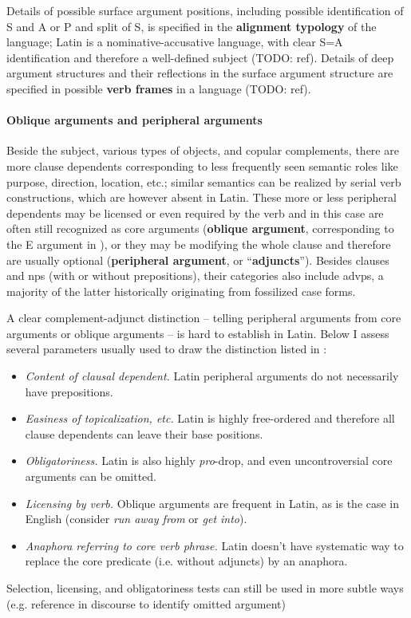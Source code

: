 \documentclass[a4paper, oneside, 12pt]{report}
\newcommand*{\citesec}[1]{\S~{#1}}
\newcommand*{\citepage}[1]{p.~{#1}}
\newcommand*{\concept}[1]{\textbf{#1}}
\newcommand*{\term}[1]{\emph{#1}}
\newcommand{\form}[1]{\emph{#1}}
\newcommand*{\category}[1]{\textsc{#1}}
\begin{document}
Details of possible surface argument positions,
including possible identification of \category{S} and \category{A} or \category{P} 
and split of \category{S},
is specified in the \concept{alignment typology} of the language;
Latin is a nominative-accusative language, 
with clear \category{S}=\category{A} identification 
and therefore a well-defined subject (TODO: ref).
Details of deep argument structures and their reflections in the surface argument structure 
are specified in possible \concept{verb frames} in a language
(TODO: ref).

\paragraph*{Oblique arguments and peripheral arguments} 
Beside the subject, various types of objects, and copular complements,
there are more clause dependents
corresponding to less frequently seen semantic roles 
like purpose, direction, location, etc.; 
similar semantics can be realized by serial verb constructions, which are however absent in Latin.
These more or less peripheral dependents may be licensed or even required by the verb 
and in this case are often still recognized as core arguments
(\concept{oblique argument}, 
corresponding to the E argument in \citet[\citepage{116}]{dixon2010basic2}),
or they may be modifying the whole clause and therefore are usually optional 
(\concept{peripheral argument}, or ``\concept{adjuncts}'').
Besides clauses and \ac{np}s (with or without prepositions),
their categories also include \ac{advp}s,
a majority of the latter historically originating from fossilized case forms.



A clear complement-adjunct distinction 
-- telling peripheral arguments from core arguments or oblique arguments --
is hard to establish in Latin.
Below I assess several parameters usually used to draw the distinction
listed in \citet[\citesec{4.1.2}]{cgel}:
\begin{itemize}
    \item \emph{Content of clausal dependent.} Latin peripheral arguments do not necessarily have prepositions.
    \item \emph{Easiness of topicalization, etc.} Latin is highly free-ordered and therefore all clause dependents 
    can leave their base positions.
    \item \emph{Obligatoriness.} Latin is also highly \term{pro}-drop,
    and even uncontroversial core arguments can be omitted.
    \item \emph{Licensing by verb.} Oblique arguments are frequent in Latin,
    as is the case in English 
    (consider \form{run away from} or \form{get into}).
    \item \emph{Anaphora referring to core verb phrase.} Latin doesn't have systematic way to replace the core predicate (i.e. without adjuncts) by an anaphora.
\end{itemize}
Selection, licensing, and obligatoriness tests 
can still be used in more subtle ways
(e.g. reference in discourse to identify omitted argument)
\end{document}
